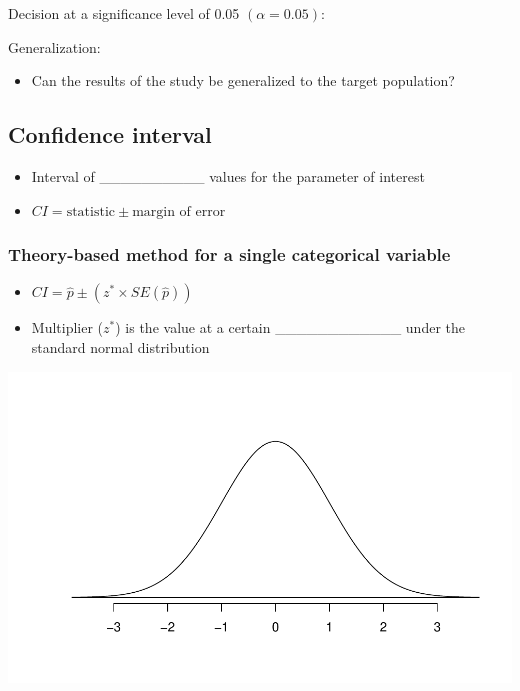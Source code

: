 \documentclass[
]{report}
\providecommand{\tightlist}{%
  \setlength{\itemsep}{0pt}\setlength{\parskip}{0pt}}
\begin{document}
\vspace{0.5in}

Decision at a significance level of 0.05 \((\alpha = 0.05)\):

\vspace{0.3in}

Generalization:

\begin{itemize}
\tightlist
\item
  Can the results of the study be generalized to the target population?
\end{itemize}

\vspace{0.4in}

\hypertarget{confidence-interval-1}{%
\subsection*{Confidence interval}\label{confidence-interval-1}}

\begin{itemize}
\item
  Interval of \_\_\_\_\_\_\_\_\_\_ values for the parameter of interest
\item
  \(CI = \text{statistic} \pm \text{margin of error}\)
\end{itemize}

\vspace{0.5in}

\hypertarget{theory-based-method-for-a-single-categorical-variable}{%
\subsubsection*{Theory-based method for a single categorical variable}\label{theory-based-method-for-a-single-categorical-variable}}

\begin{itemize}
\item
  \(CI = \hat{p} \pm (z^* \times SE(\hat{p}))\)
\item
  Multiplier (\(z^*\)) is the value at a certain \_\_\_\_\_\_\_\_\_\_\_\_ under the standard normal distribution
\end{itemize}

\begin{center}\includegraphics[width=0.5\linewidth]{07-LN07-1cat_theory_files/figure-latex/standardNormalcur-1} \end{center}
\end{document}
